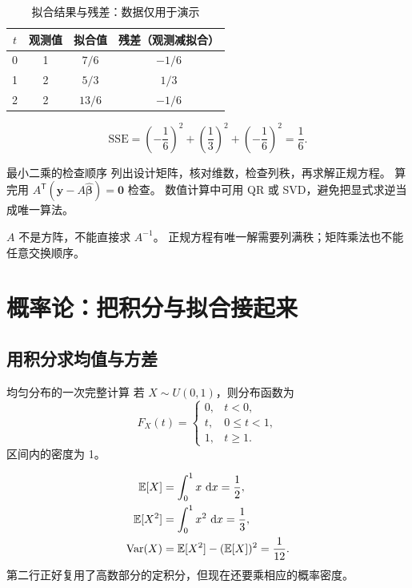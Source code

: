 \begin{table}[htbp]
\centering
\caption{拟合结果与残差：数据仅用于演示}\label{tab:fit}
\begin{tabular}{cccc}
\toprule
\(t\) & 观测值 & 拟合值 & 残差（观测减拟合） \\
\midrule
0 & 1 & \(7/6\) & \(-1/6\) \\
1 & 2 & \(5/3\) & \(1/3\) \\
2 & 2 & \(13/6\) & \(-1/6\) \\
\bottomrule
\end{tabular}
\end{table}
\[
  \mathrm{SSE}=\left(-\frac16\right)^2+
    \left(\frac13\right)^2+\left(-\frac16\right)^2=\frac16.
\]
\begin{methodbox}{最小二乘的检查顺序}
列出设计矩阵，核对维数，检查列秩，再求解正规方程。
算完用 \(A^{\mathsf T}(\bm{y}-A\widehat{\bm{\beta}})=\bm0\) 检查。
数值计算中可用 QR 或 SVD，避免把显式求逆当成唯一算法。
\end{methodbox}
\begin{pitfallbox}
\(A\) 不是方阵，不能直接求 \(A^{-1}\)。
正规方程有唯一解需要列满秩；矩阵乘法也不能任意交换顺序。
\end{pitfallbox}

\section{概率论：把积分与拟合接起来}\label{ch:probability}
\subsection{用积分求均值与方差}
\begin{conceptbox}{均匀分布的一次完整计算}
若 \(X\sim U(0,1)\)，则分布函数为
\[
  F_X(t)=\begin{cases}
    0,&t<0,\\
    t,&0\leq t<1,\\
    1,&t\geq1.
  \end{cases}
\]
区间内的密度为 1。
\end{conceptbox}
\begin{align*}
  \mathbb{E}[X]&=\int_0^1x\,\mathop{}\!\mathrm{d} x=\frac12,\\
  \mathbb{E}[X^2]&=\int_0^1x^2\,\mathop{}\!\mathrm{d} x=\frac13,\\
  \operatorname{Var}(X)&=\mathbb{E}[X^2]-(\mathbb{E}[X])^2=\frac1{12}.
\end{align*}
第二行正好复用了高数部分的定积分，但现在还要乘相应的概率密度。

